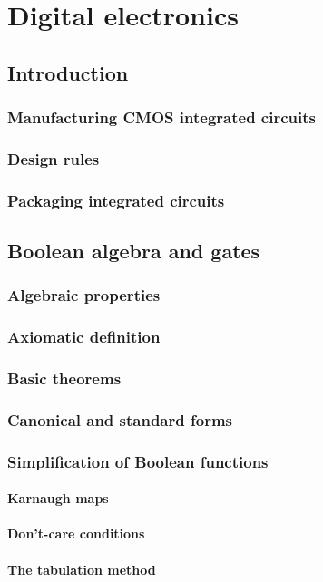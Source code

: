\documentclass{report}
\begin{document}
\part{Digital electronics}
\chapter{Introduction}
\section{Manufacturing CMOS integrated circuits}
\section{Design rules}
\section{Packaging integrated circuits}

\chapter{Boolean algebra and gates}
\section{Algebraic properties}
\section{Axiomatic definition}
\section{Basic theorems}
\section{Canonical and standard forms}
\section{Simplification of Boolean functions}
\subsection{Karnaugh maps}
\subsection{Don't-care conditions}
\subsection{The tabulation method}
\end{document}
